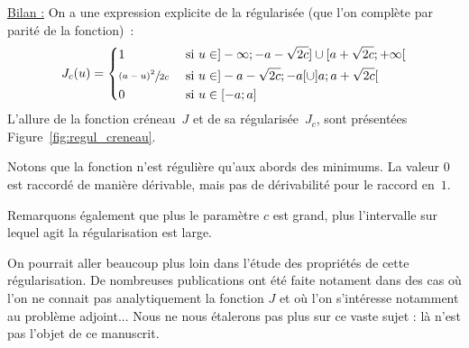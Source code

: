 \documentclass[main.tex]{subfiles}
\begin{document}
\underline{Bilan :} On a une expression explicite de la régularisée (que l'on complète par parité de la fonction)~:
\begin{equation*}
J_c(u) = \left\{  \begin{aligned}
&1 && \textrm{ si } u\in ]-\infty;-a-\sqrt{2c}] \cup [a+\sqrt{2c};+\infty[  \\
&\sfrac{(a-u)^2}{2c} && \textrm{ si } u \in ]-a-\sqrt{2c};-a[ \cup ]a;a+\sqrt{2c} [ \\
&0 && \textrm{ si } u\in [-a;a]
\end{aligned}  \right.
\end{equation*}
L'allure de la fonction créneau~$J$ et de sa régularisée~$J_c$, sont présentées Figure~\ref{fig:regul_creneau}.

Notons que la fonction n'est régulière qu'aux abords des minimums. La valeur 0 est raccordé de manière dérivable, mais pas de dérivabilité pour le raccord en~$1$.

Remarquons également que plus le paramètre $c$ est grand, plus l'intervalle sur lequel agit la régularisation est large.


On pourrait aller beaucoup plus loin dans l'étude des propriétés de cette régularisation. De nombreuses publications ont été faite notament dans des cas où l'on ne connait pas analytiquement la fonction $J$ et où l'on s'intéresse notamment au problème adjoint... Nous ne nous étalerons pas plus sur ce vaste sujet : là n'est pas l'objet de ce manuscrit.

\end{document}
